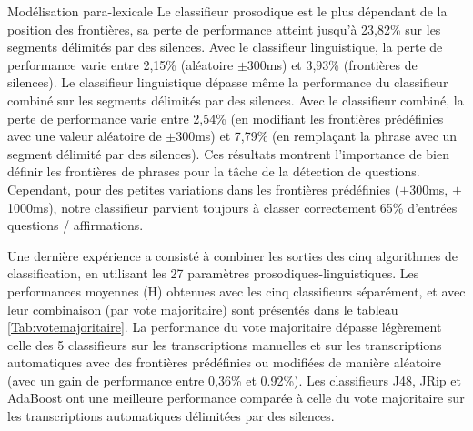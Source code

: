 \documentclass{style/these}
\begin{document}
\begin{part}{Modélisation para-lexicale}
Le classifieur prosodique est le plus dépendant de la position des frontières, sa perte de performance atteint jusqu'à 23,82\% sur les segments délimités par des silences. 
Avec le classifieur linguistique, la perte de performance varie entre 2,15\% (aléatoire $\pm$300ms) et 3,93\% (frontières de silences). 
Le classifieur linguistique dépasse même la performance du classifieur combiné sur les segments délimités par des silences. 
Avec le classifieur combiné, la perte de performance varie entre 2,54\% (en modifiant les frontières prédéfinies avec une valeur aléatoire de $\pm$300ms) et 7,79\% (en remplaçant la phrase avec un segment délimité par des silences). 
Ces résultats montrent l'importance de bien définir les frontières de phrases pour la tâche de la détection de questions. 
Cependant, pour des petites variations dans les frontières prédéfinies ($\pm$300ms, $\pm$1000ms), notre classifieur parvient toujours à classer correctement 65\% d'entrées questions / affirmations.  


Une dernière expérience a consisté à combiner les sorties des cinq algorithmes de classification, en utilisant les 27 paramètres prosodiques-linguistiques. 
Les performances moyennes (H) obtenues avec les cinq classifieurs séparément, et avec leur combinaison (par vote majoritaire) sont présentés dans le tableau \ref{Tab:votemajoritaire}. 
La performance du vote majoritaire dépasse légèrement celle des 5 classifieurs sur les transcriptions manuelles  et sur les transcriptions automatiques avec des frontières prédéfinies ou modifiées de manière aléatoire (avec un gain de performance entre 0,36\% et 0.92\%). 
Les classifieurs J48, JRip et AdaBoost ont une meilleure performance comparée à celle du vote majoritaire sur les transcriptions automatiques délimitées par des silences.  


\end{part}
\end{document}
